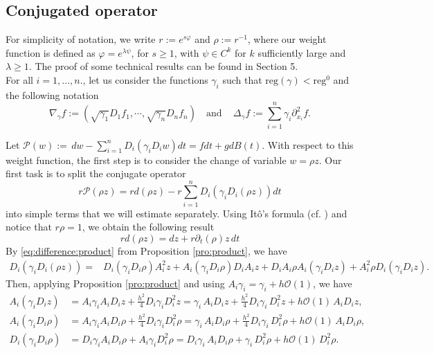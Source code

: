 \documentclass[11pt,oneside,leqno]{amsart}
\numberwithin{equation}{section}
\numberwithin{equation}{section}
\begin{document}
\subsection{Conjugated operator}\label{sec:conjugatedoperator}
For simplicity of notation, we write $r:=e^{s\varphi}$ and $\rho:=r^{-1}$, where our weight function is defined as $\varphi=e^{\lambda\psi}$, for $s\geq 1$, with $\psi\in C^{k}$ for $k$ sufficiently large and $\lambda\geq 1$. The proof of some technical results can be found in Section 5.  \\
For all $i{ =1,...,n.}$, let us consider the functions $\gamma_{i}$ such that $\mbox{reg}(\gamma)<\mbox{reg}^{0}$ and the following notation
\begin{equation*}
\nabla_{\gamma}f:=(\sqrt{\gamma_1}D_1 f_1,\cdots,\sqrt{\gamma_n}D_nf_n)\quad\text{and}\,\quad \Delta_{\gamma}f:=\sum_{i=1}^{n}\gamma_i \partial_{x_i}^{2}f. 
\end{equation*}
\par Let $\mathcal{P}(w):=\,dw-\sum_{i=1}^{n}D_{i}\left(\gamma_iD_{i}w\right)dt=fdt+gdB(t)$. With respect to this weight function, the first step is to consider the change of variable $w=\rho z$. Our first task is to split the conjugate operator 
$$r\mathcal{P}(\rho z)=rd(\rho z)-r\sum_{i=1}^{n}D_{i}\left(\gamma_{i}D_{i}(\rho z)\right)dt$$
into simple terms that we will estimate separately. Using It\^{o}'s formula  (cf. \citep[Theorem 4.18]{klebaner2012introduction}) and notice that $r\rho=1$, we obtain the following result
\begin{equation*}
    rd(\rho z)=dz+r\partial_t(\rho) z\,dt
\end{equation*}
 By \eqref{eq:difference:product} from Proposition \ref{pro:product}, we have
\begin{align*}
    D_{i}\left( \gamma_{i}D_{i}(\rho z)\right)
    =&D_{i}(\gamma_{i}D_{i}\rho)A_{i}^{2}z+A_{i}(\gamma_{i}D_{i}\rho)D_{i}A_{i}z+D_{i}A_{i}\rho A_{i}(\gamma_{i}D_{i}z)+A_{i}^{2}\rho D_{i}(\gamma_{i}D_{i}z).
\end{align*}
Then, applying Proposition \ref{pro:product} and using $A_{i}\gamma_{i}=\gamma_{i}+h\mathcal{O}(1)$, we have
\begin{align*}
    A_{i}(\gamma_{i}D_{i}z)&=A_{i}\gamma_{i}A_{i}D_{i}z+\frac{h^2}{4}D_{i}\gamma_{i}D_{i}^{2}z=\gamma_i\, A_iD_iz+\frac{h^2}{4}D_i\gamma_i\,D^2_iz+h\mathcal{O}(1)\,A_iD_iz,\\
    A_{i}(\gamma_{i}D_{i}\rho)&=A_{i}\gamma_{i}A_{i}D_{i}\rho+\frac{h^2}{4}D_{i}\gamma_{i}D_{i}^{2}\rho=\gamma_i\, A_iD_i\rho+\frac{h^2}{4}D_i\gamma_i\,D_i^2\rho+h\mathcal{O}(1)\,A_iD_i\rho,\\
    D_{i}(\gamma_{i}D_{i}\rho)&=D_{i}\gamma_{i}A_{i}D_{i}\rho+A_{i}\gamma_{i}D_{i}^{2}\rho=D_i\gamma_i\,A_iD_i\rho + \gamma_i\, D_i^2\rho+h\mathcal{O}(1)\,D_i^2\rho.
\end{align*}
\end{document}
